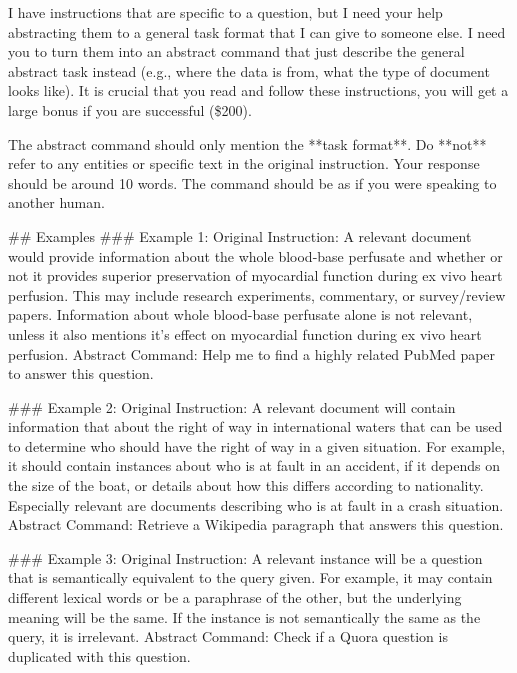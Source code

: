 \documentclass{article} %
\begin{document}
\begin{tcolorbox}[colback=white,colframe=black,title=Full Instructions to Short Instructions]
I have instructions that are specific to a question, but I need your help abstracting them to a general task format that I can give to someone else.  I need you to turn them into an abstract command that just describe the general abstract task instead (e.g., where the data is from, what the type of document looks like). It is crucial that you read and follow these instructions, you will get a large bonus if you are successful (\$200).\newline

The abstract command should only mention the **task format**.   Do **not** refer to any entities or specific text in the original instruction. Your response should be around 10 words. The command should be as if you were speaking to another human.\newline

\#\# Examples\newline
\#\#\# Example 1:\newline
Original Instruction: A relevant document would provide information about the whole blood-base perfusate and whether or not it provides superior preservation of myocardial function during ex vivo heart perfusion. This may include research experiments, commentary, or survey/review papers. Information about whole blood-base perfusate alone is not relevant, unless it also mentions it's effect on myocardial function during ex vivo heart perfusion.\newline
Abstract Command: Help me to find a highly related PubMed paper to answer this question.\newline

\#\#\# Example 2:\newline
Original Instruction: A relevant document will contain information that about the right of way in international waters that can be used to determine who should have the right of way in a given situation. For example, it should contain instances about who is at fault in an accident, if it depends on the size of the boat, or details about how this differs according to nationality. Especially relevant are documents describing who is at fault in a crash situation.\newline
Abstract Command: Retrieve a Wikipedia paragraph that answers this question. \newline

\#\#\# Example 3:\newline
Original Instruction: A relevant instance will be a question that is semantically equivalent to the query given.  For example, it may contain different lexical words or be a paraphrase of the other, but the underlying meaning will be the same. If the instance is not semantically the same as the query, it is irrelevant.\newline
Abstract Command: Check if a Quora question is duplicated with this question.\newline


\end{tcolorbox}
\end{document}
